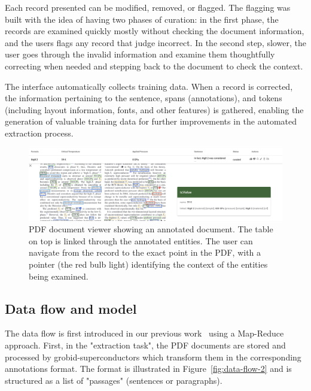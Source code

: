 \documentclass[a4paper]{article}
\begin{document}
Each record presented can be modified, removed, or flagged. The flagging was built with the idea of having two phases of curation: in the first phase, the records are examined quickly mostly without checking the document information, and the users flags any record that judge incorrect. In the second step, slower, the user goes through the invalid information and examine them thoughtfully correcting when needed and stepping back to the document to check the context. 

The interface automatically collects training data. When a record is corrected, the information pertaining to the sentence, spans (annotations), and tokens (including layout information, fonts, and other features) is gathered, enabling the generation of valuable training data for further improvements in the automated extraction process.

\begin{figure}[ht]
  \centering
  \includegraphics[width=1\textwidth]{images/pdf-view-context.png} 
  \caption{PDF document viewer showing an annotated document. The table on top is linked through the annotated entities. The user can navigate from the record to the exact point in the PDF, with a pointer (the red bulb light) identifying the context of the entities being examined. }
  \label{fig:pdf-view}
\end{figure}



\subsection{Data flow and model}
\label{subsec:data-flow}

The data flow is first introduced in our previous work~\cite{lfoppiano2023automatic} using a Map-Reduce approach. 
First, in the "extraction task", the PDF documents are stored and processed by grobid-superconductors which transform them in the corresponding annotations format. The format is illustrated in Figure~\ref{fig:data-flow-2} and is structured as a list of "passages" (sentences or paragraphs). 
\end{document}
